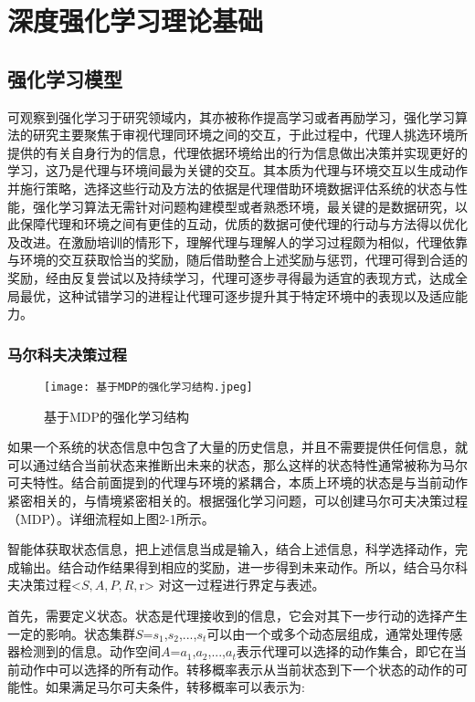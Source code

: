 \chapter{深度强化学习理论基础}

\section{强化学习模型}

可观察到强化学习于研究领域内，其亦被称作提高学习或者再励学习，强化学习算法的研究主要聚焦于审视代理同环境之间的交互，于此过程中，代理人挑选环境所提供的有关自身行为的信息，代理依据环境给出的行为信息做出决策并实现更好的学习，这乃是代理与环境间最为关键的交互。其本质为代理与环境交互以生成动作并施行策略，选择这些行动及方法的依据是代理借助环境数据评估系统的状态与性能，强化学习算法无需针对问题构建模型或者熟悉环境，最关键的是数据研究，以此保障代理和环境之间有更佳的互动，优质的数据可使代理的行动与方法得以优化及改进。在激励培训的情形下，理解代理与理解人的学习过程颇为相似，代理依靠与环境的交互获取恰当的奖励，随后借助整合上述奖励与惩罚，代理可得到合适的奖励，经由反复尝试以及持续学习，代理可逐步寻得最为适宜的表现方式，达成全局最优，这种试错学习的进程让代理可逐步提升其于特定环境中的表现以及适应能力。
\subsection{马尔科夫决策过程}


\begin{figure}[hbt]
	\centering
	\texttt{[image: 基于MDP的强化学习结构.jpeg]}
	\caption{基于MDP的强化学习结构}
	\label{f.example}
\end{figure}

如果一个系统的状态信息中包含了大量的历史信息，并且不需要提供任何信息，就可以通过结合当前状态来推断出未来的状态，那么这样的状态特性通常被称为马尔可夫特性。结合前面提到的代理与环境的紧耦合，本质上环境的状态是与当前动作紧密相关的，与情境紧密相关的。根据强化学习问题，可以创建马尔可夫决策过程（MDP）\cite{garcia2013markov}。详细流程如上图2-1所示。

智能体获取状态信息，把上述信息当成是输入，结合上述信息，科学选择动作，完成输出。结合动作结果得到相应的奖励，进一步得到未来动作。所以，结合马尔科夫决策过程<$S,A,P,R,$r>
对这一过程进行界定与表述。

首先，需要定义状态。状态是代理接收到的信息，它会对其下一步行动的选择产生一定的影响。状态集群$S$={${s_{1}}$,${s_{2}}$,...,${s_{t}}$}可以由一个或多个动态层组成，通常处理传感器检测到的信息。动作空间$A$={${a_{1}}$,${a_{2}}$,...,${a_{t}}$}表示代理可以选择的动作集合，即它在当前动作中可以选择的所有动作。转移概率表示从当前状态到下一个状态的动作的可能性。如果满足马尔可夫条件，转移概率可以表示为:

